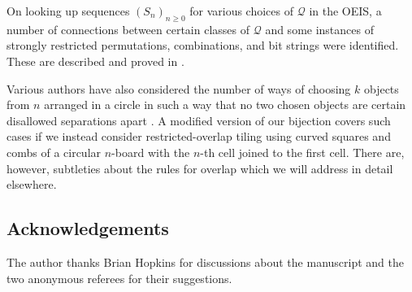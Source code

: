 \documentclass[preprint,3p]{elsarticle}
\begin{document}
On looking up sequences $(S_n)_{n\geq0}$ for various choices of
$\mathcal{Q}$ in the OEIS, a number of connections between certain
classes of $\mathcal{Q}$ and some instances of strongly restricted
permutations, combinations, and bit strings were identified. These
are described and proved in \cite{All-ConnComb}.

Various authors have also considered the number of ways of choosing
$k$ objects from $n$ arranged in a circle in such a way that no two
chosen objects are certain disallowed separations apart
\cite{Kap43,Kon81,Mos86,MS08,Guo08,GZ09}. A modified version of our bijection
covers such cases if we instead consider restricted-overlap tiling
using curved squares and combs of a circular $n$-board with
the $n$-th cell joined to the first cell. There are, however,
subtleties about the rules for overlap which we will address in detail
elsewhere.

\subsection*{Acknowledgements}
The author thanks Brian Hopkins for discussions about the manuscript
and the two anonymous referees for their suggestions.
\end{document}
